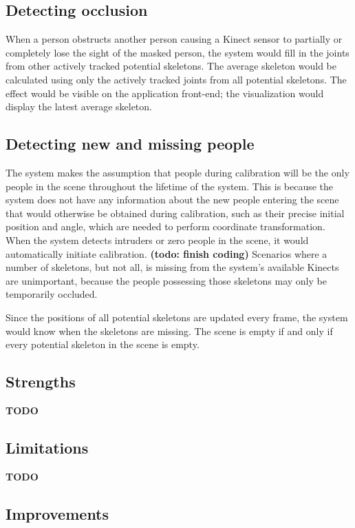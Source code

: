 \documentclass{sigchi}
\begin{document}
\subsection{Detecting occlusion}

When a person obstructs another person causing a Kinect sensor to partially or completely lose the sight of the masked person, the system would fill in the joints from other actively tracked potential skeletons. The average skeleton would be calculated using only the actively tracked joints from all potential skeletons. The effect would be visible on the application front-end; the visualization would display the latest average skeleton.

\subsection{Detecting new and missing people}

The system makes the assumption that people during calibration will be the only people in the scene throughout the lifetime of the system. This is because the system does not have any information about the new people entering the scene that would otherwise be obtained during calibration, such as their precise initial position and angle, which are needed to perform coordinate transformation. When the system detects intruders or zero people in the scene, it would automatically initiate calibration. \textbf{(todo: finish coding)} Scenarios where a number of skeletons, but not all, is missing from the system's available Kinects are unimportant, because the people possessing those skeletons may only be temporarily occluded.

Since the positions of all potential skeletons are updated every frame, the system would know when the skeletons are missing. The scene is empty if and only if every potential skeleton in the scene is empty.

\subsection{Strengths}

\textbf{TODO}

\subsection{Limitations}

\textbf{TODO}

\subsection{Improvements}
\end{document}

